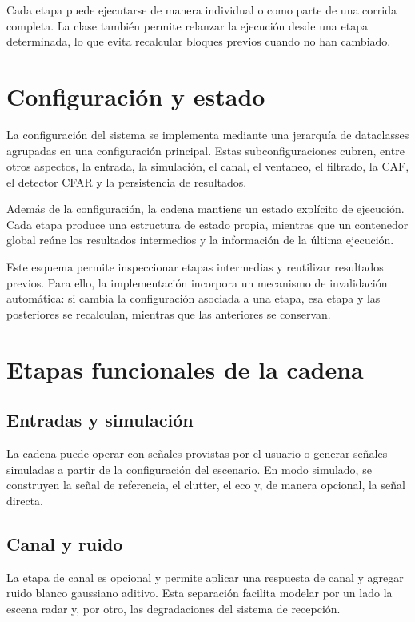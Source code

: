 Cada etapa puede ejecutarse de manera individual o como parte de una corrida completa. La clase también permite relanzar la ejecución desde una etapa determinada, lo que evita recalcular bloques previos cuando no han cambiado.

\section{Configuración y estado}

La configuración del sistema se implementa mediante una jerarquía de dataclasses agrupadas en una configuración principal. Estas subconfiguraciones cubren, entre otros aspectos, la entrada, la simulación, el canal, el ventaneo, el filtrado, la CAF, el detector CFAR y la persistencia de resultados.

Además de la configuración, la cadena mantiene un estado explícito de ejecución. Cada etapa produce una estructura de estado propia, mientras que un contenedor global reúne los resultados intermedios y la información de la última ejecución.

Este esquema permite inspeccionar etapas intermedias y reutilizar resultados previos. Para ello, la implementación incorpora un mecanismo de invalidación automática: si cambia la configuración asociada a una etapa, esa etapa y las posteriores se recalculan, mientras que las anteriores se conservan.

\section{Etapas funcionales de la cadena}

\subsection{Entradas y simulación}

La cadena puede operar con señales provistas por el usuario o generar señales simuladas a partir de la configuración del escenario. En modo simulado, se construyen la señal de referencia, el clutter, el eco y, de manera opcional, la señal directa.

\subsection{Canal y ruido}

La etapa de canal es opcional y permite aplicar una respuesta de canal y agregar ruido blanco gaussiano aditivo. Esta separación facilita modelar por un lado la escena radar y, por otro, las degradaciones del sistema de recepción.

